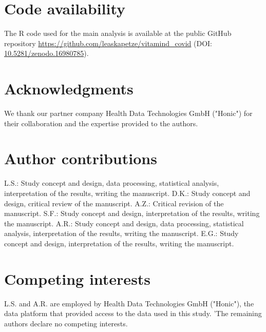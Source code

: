 \documentclass[12pt]{article}
\begin{document}
\vspace{0.4cm}
\section*{Code availability}
The R code used for the main analysis is available at the public GitHub repository 
\url{https://github.com/leaskapetze/vitamind_covid} (DOI: \href{https://doi.org/10.5281/zenodo.16980785}{10.5281/zenodo.16980785}).

\newpage


\newpage
\section*{Acknowledgments}
We thank our partner company Health Data Technologies GmbH ("Honic") for their collaboration and the expertise provided to the authors. 

\vspace{0.4cm}
\section*{Author contributions}
L.S.: Study concept and design, data processing, statistical analysis, interpretation of the results, writing the manuscript. D.K.: Study concept and design, critical review of the manuscript. A.Z.: Critical revision of the manuscript. S.F.: Study concept and design, interpretation of the results, writing the manuscript. A.R.: Study concept and design, data processing, statistical analysis, interpretation of the results, writing the manuscript. E.G.: Study concept and design, interpretation of the results, writing the manuscript.

\vspace{0.4cm}
\section*{Competing interests}
L.S. and A.R. are employed by Health Data Technologies GmbH ("Honic"), the data platform that provided access to the data used in this study. 'The remaining authors declare no competing interests.
\newpage
\vspace{0.4cm}
\end{document}
